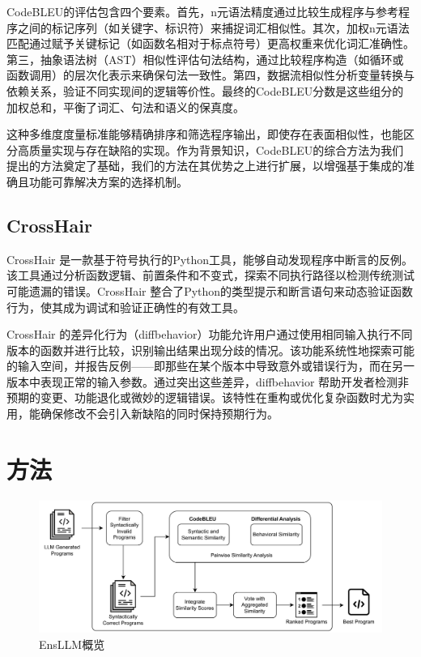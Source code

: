 \documentclass{article}
\newcommand{\tool}{EnsLLM}
\begin{document}
CodeBLEU的评估包含四个要素。首先，n元语法精度通过比较生成程序与参考程序之间的标记序列（如关键字、标识符）来捕捉词汇相似性。其次，加权n元语法匹配通过赋予关键标记（如函数名相对于标点符号）更高权重来优化词汇准确性。第三，抽象语法树（AST）相似性评估句法结构，通过比较程序构造（如循环或函数调用）的层次化表示来确保句法一致性。第四，数据流相似性分析变量转换与依赖关系，验证不同实现间的逻辑等价性。最终的CodeBLEU分数是这些组分的加权总和，平衡了词汇、句法和语义的保真度。

这种多维度度量标准能够精确排序和筛选程序输出，即使存在表面相似性，也能区分高质量实现与存在缺陷的实现。作为背景知识，CodeBLEU的综合方法为我们提出的方法奠定了基础，我们的方法在其优势之上进行扩展，以增强基于集成的准确且功能可靠解决方案的选择机制。
\subsection{CrossHair}
CrossHair \cite{crosshair} 是一款基于符号执行的Python工具，能够自动发现程序中断言的反例。该工具通过分析函数逻辑、前置条件和不变式，探索不同执行路径以检测传统测试可能遗漏的错误。CrossHair 整合了Python的类型提示和断言语句来动态验证函数行为，使其成为调试和验证正确性的有效工具。

CrossHair 的差异化行为（diffbehavior）功能允许用户通过使用相同输入执行不同版本的函数并进行比较，识别输出结果出现分歧的情况。该功能系统性地探索可能的输入空间，并报告反例——即那些在某个版本中导致意外或错误行为，而在另一版本中表现正常的输入参数。通过突出这些差异，diffbehavior 帮助开发者检测非预期的变更、功能退化或微妙的逻辑错误。该特性在重构或优化复杂函数时尤为实用，能确保修改不会引入新缺陷的同时保持预期行为。
\section{方法}

\begin{figure}[t!]
    \centering
    \includegraphics[width=\linewidth]{figure/EnsembledLLM.pdf}
    \caption{\tool 概览}
    \label{fig:overview}
\end{figure}
\end{document}
